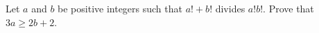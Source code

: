 Let 
$a$
 and 
$b$
 be positive integers such that 
$a! + b!$
 divides 
$a!b!$.
 Prove that 
$3a \ge 2b + 2$.
